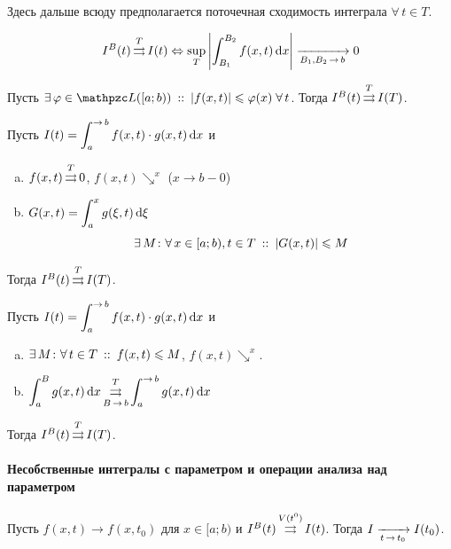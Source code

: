 \documentclass[draft, timbord]{longnotes}
\begin{document}
Здесь дальше всюду предполагается поточечная сходимость интеграла $\forall\, t \in T$.

\begin{thrm}\label{thrm:meas::paruniconv::bk}
  \[
    I^B(t) \unito^T I(t) \Leftrightarrow 
    \sup_{T} \left| \int_{B_1}^{B_2} f(x,t)\, \del x \right| \xto{B_1, B_2 \to b} 0
  \]
\end{thrm}

\begin{thrm}\label{thrm:meas::paruniconv::wei}
  Пусть $\exists\, \varphi\in \summb([a;b))\that |f(x,t)| \leqslant \varphi (x)\; \forall\, t$.
  Тогда $I^B(t) \mathop{\rightrightarrows}\limits^T I(T)$.
\end{thrm}

\begin{thrm}\label{thrm:meas::paruniconv::dir}
  Пусть $I(t) = \dint_{a}^{\to b} f(x,t) \cdot g(x,t) \, \del x$ и
  \begin{enumerate}[a)]
    \item $f(x,t) \mathop{\rightrightarrows}\limits^T 0$, $f(x,t) \searrow^x$ ($x\to b-0$)
    \item $G(x,t) = \displaystyle\int_a^x g(\xi, t) \, \mathrm{d} \xi$
      \[
        \exists\, M \colon \forall\, x \in [a;b), t\in T \:::\: | G(x,t) | \leqslant M   
      \]
  \end{enumerate}
  Тогда $I^B(t) \mathop{\rightrightarrows}\limits^T I(T)$.
\end{thrm}

\begin{thrm}\label{thrm:meas::paruniconv::abel}
  Пусть $I(t) = \dint_{a}^{\to b} f(x,t) \cdot g(x,t) \, \del x$ и
  \begin{enumerate}[a)]
    \item $\exists\, M \colon \forall\, t\in T \:::\: f(x,t) \leqslant M$,
      $f(x,t) \searrow^x$.
    \item 
      $\displaystyle
      \int_a^{B} g(x,t) \, \del x \unito^T_{B\to b} \int_a^{\to b} g(x,t) \, \del x 
      $
  \end{enumerate}
  Тогда $I^B(t) \mathop{\rightrightarrows}\limits^T I(T)$.
\end{thrm}

\paragraph{Несобственные интегралы с параметром и операции анализа над параметром \underdev}
\label{par:meas::parimpconv}

\begin{thrm}\label{thrm:meas::parimpconv::lim}
  Пусть $f(x,t) \to f(x,t_0)$ для \alev $x \in [a;b)$ и $I^B(t) \mathop{\rightrightarrows}\limits^{V(t^0)} I(t)$.
  Тогда $I \xto{t\to t_0} I(t_0)$.
\end{thrm}
\end{document}
